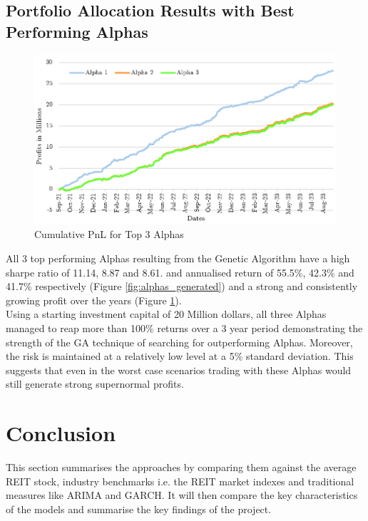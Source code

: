 \documentclass[a4paper,12pt]{report}
\numberwithin{equation}{section}
\theoremstyle{definition}
\begin{document}
\section{Portfolio Allocation Results with Best Performing Alphas}

\begin{figure}[H]
  \centerline{\includegraphics[width=15cm]{Alphas Profit Over Time}}
  \caption{Cumulative PnL for Top 3 Alphas}
  \label{fig:pnl_top_3}
\end{figure}
All 3 top performing Alphas resulting from the Genetic Algorithm have a high sharpe ratio of 11.14, 8.87 and 8.61. and annualised return of 55.5\%, 42.3\% and 41.7\% respectively (Figure \ref{fig:alphas_generated}) and a strong and consistently growing profit over the years (Figure \ref{fig:pnl_top_3}). \\

Using a starting investment capital of 20 Million dollars, all three Alphas managed to reap more than 100\% returns over a 3 year period demonstrating the strength of the GA technique of searching for outperforming Alphas. Moreover, the risk is maintained at a relatively low level at a 5\% standard deviation. This suggests that even in the worst case scenarios trading with these Alphas would still generate strong supernormal profits.


\chapter{Conclusion}
This section summarises the approaches by comparing them against the average REIT stock, industry benchmarks i.e. the REIT market indexes and traditional measures like ARIMA and GARCH. It will then compare the key characteristics of the models and summarise the key findings of the project. 
\end{document}
